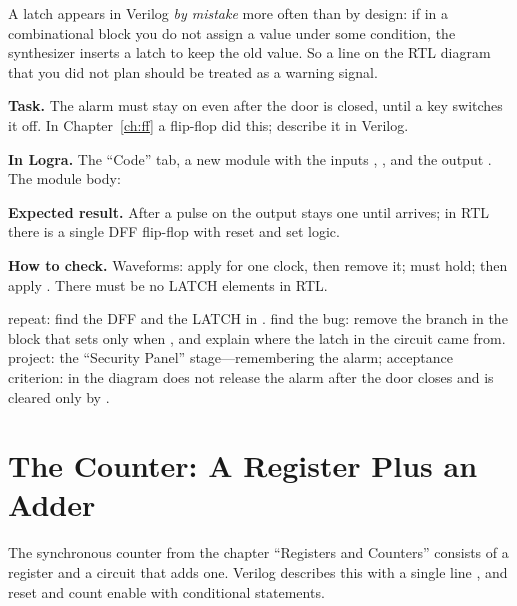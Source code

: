 \begin{warnbox}
A latch appears in Verilog \emph{by mistake} more often than by design: if in a
combinational block you do not assign a value under some condition, the synthesizer
inserts a latch to keep the old value. So a  line
on the RTL diagram that you did not plan should be treated as a
warning signal.
\end{warnbox}

\begin{diybox}
\textbf{Task.} The alarm must stay on even after the door is closed, until a key switches it off. In Chapter~\ref{ch:ff} a flip-flop did this; describe it in Verilog.

\textbf{In Logra.} The ``Code'' tab, a new module with the inputs , ,  and the output . The module body: 

\textbf{Expected result.} After a pulse on  the output  stays one until  arrives; in RTL there is a single DFF flip-flop with reset and set logic.

\textbf{How to check.} Waveforms: apply  for one clock, then remove it;  must hold; then apply . There must be no LATCH elements in RTL.

 repeat: find the DFF and the LATCH in .  find the bug: remove the  branch in the  block that sets  only when , and explain where the latch in the circuit came from.  project: the ``Security Panel'' stage---remembering the alarm; acceptance criterion: in the diagram  does not release the alarm after the door closes and is cleared only by .
\end{diybox}

\section{The Counter: A Register Plus an Adder}

The synchronous counter from the chapter ``Registers and Counters'' consists of a register and
a circuit that adds one. Verilog describes this with a single line
, and reset and count enable with conditional statements.


